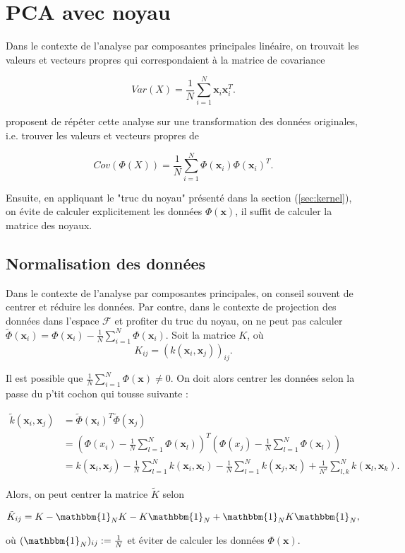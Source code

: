 \section{PCA avec noyau}

Dans le contexte de l'analyse par composantes principales linéaire, on trouvait les valeurs et vecteurs propres qui correspondaient à la matrice de covariance 

\begin{equation*}
Var(X) = \frac{1}{N} \sum_{i = 1}^N \textbf{x}_i \textbf{x}_i^T.
\end{equation*}

\cite{scholkopf1997kernel} proposent de répéter cette analyse sur une transformation des données originales, i.e. trouver les valeurs et vecteurs propres de

\begin{equation}\label{eq:covkernel}
Cov(\Phi(X)) = \frac{1}{N} \sum_{i = 1}^{N} \Phi(\textbf{x}_i)\Phi(\textbf{x}_i)^T.
\end{equation}

Ensuite, en appliquant le "truc du noyau" présenté dans la section (\ref{sec:kernel}), on évite de calculer explicitement les données $\Phi(\textbf{x})$, il suffit de calculer la matrice des noyaux.

\subsection{Normalisation des données}

Dans le contexte de l'analyse par composantes principales, on conseil souvent de centrer et réduire les données. Par contre, dans le contexte de projection des données dans l'espace $\mathcal{F}$ et profiter du truc du noyau, on ne peut pas calculer $\tilde{\Phi}(\textbf{x}_i) = \Phi(\textbf{x}_i) - \frac{1}{N}\sum_{i = 1}^{N}\Phi(\textbf{x}_i)$. 
Soit la matrice $K$, où 
$$K_{ij} = (k(\textbf{x}_i, \textbf{x}_j))_{ij}.$$

Il est possible que $\frac{1}{N} \sum_{i = 1}^{N} \Phi(\textbf{x}) \neq 0$. On doit alors centrer les données selon la passe du p'tit cochon qui tousse suivante : 

\begin{align*}
\tilde{k}(\textbf{x}_i, \textbf{x}_j) &= \tilde{\Phi}(\textbf{x}_i)^T\tilde{\Phi}(\textbf{x}_j)\\
&= \left( \Phi(x_i) - \frac{1}{N}\sum_{l = 1}^{N}\Phi(\textbf{x}_l) \right)^T \left(\Phi(x_j) - \frac{1}{N}\sum_{l = 1}^{N}\Phi(\textbf{x}_l)\right)\\
&= k(\textbf{x}_i, \textbf{x}_j) - \frac{1}{N}\sum_{l = 1}^{N}k(\textbf{x}_i, \textbf{x}_l) - \frac{1}{N}\sum_{l = 1}^{N}k(\textbf{x}_j, \textbf{x}_l) + \frac{1}{N^2} \sum_{l, k}^{N}k(\textbf{x}_l, \textbf{x}_k).
\end{align*}

Alors, on peut centrer la matrice $\tilde{K}$ selon

\begin{equation*}
\tilde{K}_{ij} = K - \mathbbm{1}_NK - K\mathbbm{1}_N + \mathbbm{1}_NK\mathbbm{1}_N,
\end{equation*}

où $(\mathbbm{1}_N)_{ij} := \frac{1}{N}$ et éviter de calculer les données $\Phi(\textbf{x})$. 


